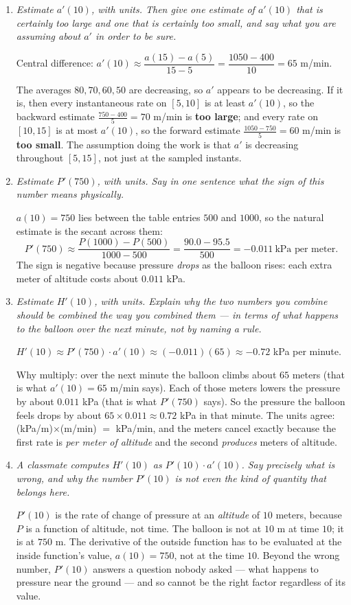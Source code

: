 \documentclass[11pt]{article}
\newcommand{\q}[1]{{\color{gray!55!black}\itshape #1}\par\smallskip}
\begin{document}
\begin{enumerate}
\item \q{Estimate $a'(10)$, with units. Then give one estimate of $a'(10)$ that is certainly too large and one that is certainly too small, and say what you are assuming about $a'$ in order to be sure.}
Central difference: $a'(10)\approx\dfrac{a(15)-a(5)}{15-5} = \dfrac{1050-400}{10}
= 65$ m/min.

The averages $80,70,60,50$ are decreasing, so $a'$ appears to be decreasing. If it is,
then every instantaneous rate on $[5,10]$ is at least $a'(10)$, so the backward estimate
$\frac{750-400}{5}=70$ m/min is \textbf{too large}; and every rate on $[10,15]$ is at most
$a'(10)$, so the forward estimate $\frac{1050-750}{5}=60$ m/min is \textbf{too small}.
The assumption doing the work is that $a'$ is decreasing throughout $[5,15]$, not just at
the sampled instants.

\item \q{Estimate $P'(750)$, with units. Say in one sentence what the sign of this number means physically.}
$a(10)=750$ lies between the table entries $500$ and $1000$, so the natural estimate
is the secant across them:
\[
P'(750)\approx\frac{P(1000)-P(500)}{1000-500}=\frac{90.0-95.5}{500} = -0.011
\ \text{kPa per meter.}
\]
The sign is negative because pressure \emph{drops} as the balloon rises: each extra meter
of altitude costs about $0.011$ kPa.

\item \q{Estimate $H'(10)$, with units. Explain why the two numbers you combine should be combined the way you combined them --- in terms of what happens to the balloon over the next minute, not by naming a rule.}
$H'(10)\approx P'(750)\cdot a'(10)\approx(-0.011)(65)\approx -0.72$ kPa per minute.

Why multiply: over the next minute the balloon climbs about $65$ meters (that is what
$a'(10)=65$ m/min says). Each of those meters lowers the pressure by about $0.011$ kPa
(that is what $P'(750)$ says). So the pressure the balloon feels drops by about
$65\times0.011\approx0.72$ kPa in that minute. The units agree: (kPa/m)$\times$(m/min)
$=$ kPa/min, and the meters cancel exactly because the first rate is \emph{per meter of
altitude} and the second \emph{produces} meters of altitude.

\item \q{A classmate computes $H'(10)$ as $P'(10)\cdot a'(10)$. Say precisely what is wrong, and why the number $P'(10)$ is not even the kind of quantity that belongs here.}
$P'(10)$ is the rate of change of pressure at an \emph{altitude} of $10$ meters,
because $P$ is a function of altitude, not time. The balloon is not at $10$ m at time $10$;
it is at $750$ m. The derivative of the outside function has to be evaluated at the inside
function's value, $a(10)=750$, not at the time $10$. Beyond the wrong number, $P'(10)$
answers a question nobody asked --- what happens to pressure near the ground --- and so
cannot be the right factor regardless of its value.
\end{enumerate}
\end{document}
